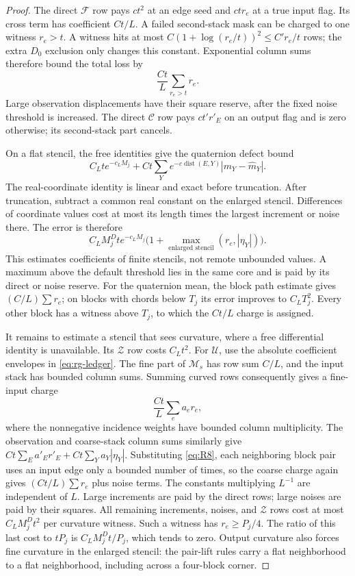 \begin{proof}
The direct $\mathcal F$ row pays $ct^2$ at an edge seed and $ctr_e$ at a
true input flag.  Its cross term has coefficient $Ct/L$.  A failed
second-stack mask can be charged to one witness $r_e>t$.  A witness
hits at most $C(1+\log(r_e/t))^2\le C'r_e/t$ rows; the extra $D_0$
exclusion only changes this constant.  Exponential column sums therefore
bound the total loss by
\[
                         \frac{Ct}{L}\sum_{r_e>t}r_e.
\]
Large observation displacements have their square reserve, after the
fixed noise threshold is increased.  The direct $\mathcal C$ row pays
$ct'r'_E$ on an output flag and is zero otherwise; its second-stack
part cancels.

On a flat stencil, the free identities give the quaternion defect bound
\[
 C_Lt e^{-c_LM_j}
       +Ct\sum_Y e^{-c\operatorname{dist}(E,Y)}|m_Y-\widehat m_Y|.
\]
The real-coordinate identity is linear and exact before truncation.
After truncation, subtract a common real constant on the enlarged
stencil.  Differences of coordinate values cost at most its length
times the largest increment or noise there.  The error is therefore
\[
 C_LM_j^Dt e^{-c_LM_j}
       \bigl(1+\max_{\text{enlarged stencil}}(r_e,|\eta_Y|)\bigr).
\]
This estimates coefficients of finite stencils, not remote unbounded
values.  A maximum above the default threshold lies in the same core
and is paid by its direct or noise reserve.  For the quaternion mean,
the block path estimate gives $(C/L)\sum r_e$; on blocks with chords
below $T_j$ its error improves to $C_LT_j^2$.  Every other block has a
witness above $T_j$, to which the $Ct/L$ charge is assigned.

It remains to estimate a stencil that sees curvature, where a
free differential identity is unavailable.  Its $\mathcal Z$ row costs
$C_Lt^2$.  For $\mathcal U$, use the absolute coefficient envelopes in
\eqref{eq:rg-ledger}.  The fine part of $\mathcal M_s$ has row sum
$C/L$, and the input stack has bounded column sums.  Summing curved
rows consequently gives a fine-input charge
\[
                  \frac{Ct}{L}\sum_e a_er_e,
\]
where the nonnegative incidence weights have bounded column
multiplicity.  The observation and coarse-stack column sums similarly
give $Ct\sum_E a'_Er'_E+Ct\sum_Ya_Y|\eta_Y|$.  Substituting
\eqref{eq:R8}, each neighboring block pair uses an input edge only a
bounded number of times, so the coarse charge again gives
$(Ct/L)\sum r_e$ plus noise terms.  The constants multiplying $L^{-1}$
are independent of $L$.  Large increments are paid by the direct rows;
large noises are paid by their squares.  All remaining increments,
noises, and $\mathcal Z$ rows cost at most $C_LM_j^Dt^2$ per curvature
witness.  Such a witness has $r_e\ge P_j/4$.  The ratio of this last
cost to $tP_j$ is $C_LM_j^Dt/P_j$, which tends to zero.  Output curvature
also forces fine curvature in the enlarged stencil: the pair-lift rules
carry a flat neighborhood to a flat neighborhood, including across a
four-block corner.


\end{proof}

